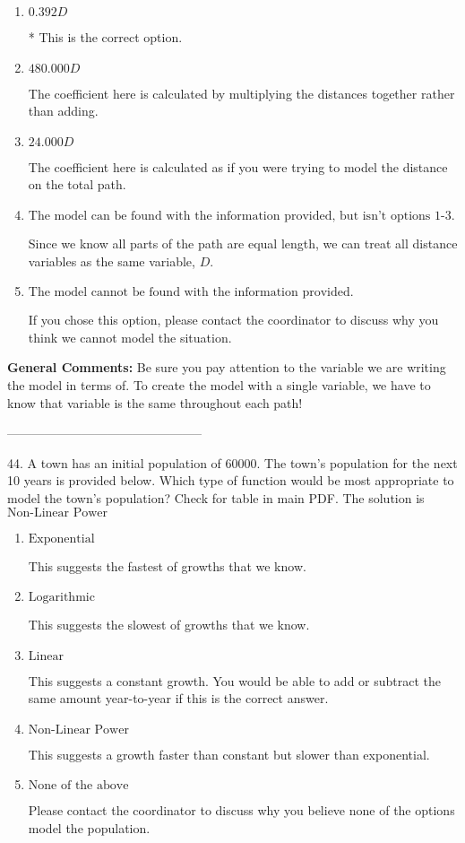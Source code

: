 \documentclass{extbook}[14pt]
\begin{document}
\begin{enumerate}[label=\Alph*.] 
\item $ 0.392 D $ 

 * This is the correct option. 
\item $ 480.000 D $ 

 The coefficient here is calculated by multiplying the distances together rather than adding. 
\item $ 24.000 D $ 

 The coefficient here is calculated as if you were trying to model the distance on the total path. 
\item $ \text{The model can be found with the information provided, but isn't options 1-3.} $ 

 Since we know all parts of the path are equal length, we can treat all distance variables as the same variable, $D$. 
\item $ \text{The model cannot be found with the information provided.} $ 

 If you chose this option, please contact the coordinator to discuss why you think we cannot model the situation. 
\end{enumerate} 
 
\textbf{General Comments:} Be sure you pay attention to the variable we are writing the model in terms of. To create the model with a single variable, we have to know that variable is the same throughout each path!

-----------------------------------------------

44. A town has an initial population of 60000. The town's population for the next 10 years is provided below. Which type of function would be most appropriate to model the town's population?
Check for table in main PDF. 
The solution is $ \text{Non-Linear Power} $ 

\begin{enumerate}[label=\Alph*.] 
\item $ \text{Exponential} $ 

 This suggests the fastest of growths that we know. 
\item $ \text{Logarithmic} $ 

 This suggests the slowest of growths that we know. 
\item $ \text{Linear} $ 

 This suggests a constant growth. You would be able to add or subtract the same amount year-to-year if this is the correct answer. 
\item $ \text{Non-Linear Power} $ 

 This suggests a growth faster than constant but slower than exponential. 
\item $ \text{None of the above} $ 

 Please contact the coordinator to discuss why you believe none of the options model the population. 
\end{enumerate} 
 
\end{document}

